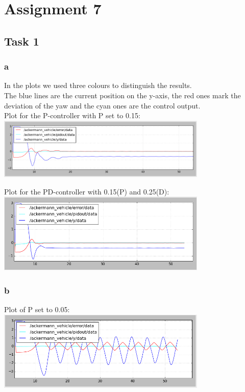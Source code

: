 \chapter{Assignment 7}\label{ass7}

\section{Task 1}\label{ass7_t1}

\subsection{a}\label{ass7_t1a}

In the plots we used three colours to distinguish the results.\\
The blue lines are the current position on the y-axis, the red ones mark the deviation of the yaw and the cyan ones are the control output.\\

Plot for the P-controller with P set to 0.15:\\
\includegraphics[width=0.75\textwidth]{img/screen_ue7_t1_p-015.png}

Plot for the PD-controller with 0.15(P) and 0.25(D):\\
\includegraphics[width=0.75\textwidth]{img/screen_ue7_t1_p-015_d-025.png}

\subsection{b}\label{ass7_t1b}

Plot of P set to 0.05:\\
\includegraphics[width=0.75\textwidth]{img/screen_ue7_t2_p-005_osz.png}

